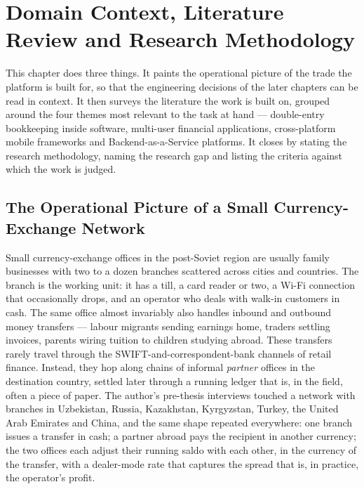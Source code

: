 \chapter{Domain Context, Literature Review and Research Methodology}
\label{chap:litreview}

This chapter does three things. It paints the operational picture of the trade the platform is built for, so that the engineering decisions of the later chapters can be read in context. It then surveys the literature the work is built on, grouped around the four themes most relevant to the task at hand --- double-entry bookkeeping inside software, multi-user financial applications, cross-platform mobile frameworks and Backend-as-a-Service platforms. It closes by stating the research methodology, naming the research gap and listing the criteria against which the work is judged.

\section{The Operational Picture of a Small Currency-Exchange Network}
\label{sec:domain}

Small currency-exchange offices in the post-Soviet region are usually family businesses with two to a dozen branches scattered across cities and countries. The branch is the working unit: it has a till, a card reader or two, a Wi-Fi connection that occasionally drops, and an operator who deals with walk-in customers in cash. The same office almost invariably also handles inbound and outbound money transfers --- labour migrants sending earnings home, traders settling invoices, parents wiring tuition to children studying abroad. These transfers rarely travel through the SWIFT-and-correspondent-bank channels of retail finance. Instead, they hop along chains of informal \emph{partner} offices in the destination country, settled later through a running ledger that is, in the field, often a piece of paper. The author's pre-thesis interviews touched a network with branches in Uzbekistan, Russia, Kazakhstan, Kyrgyzstan, Turkey, the United Arab Emirates and China, and the same shape repeated everywhere: one branch issues a transfer in cash; a partner abroad pays the recipient in another currency; the two offices each adjust their running saldo with each other, in the currency of the transfer, with a dealer-mode rate that captures the spread that is, in practice, the operator's profit.


